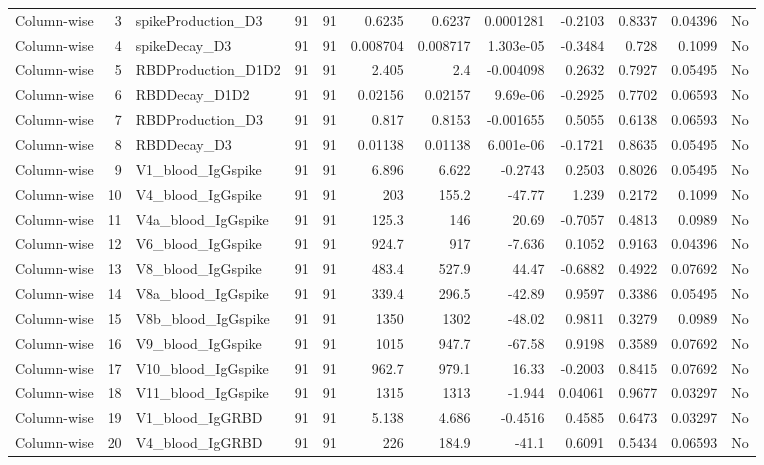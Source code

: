 \begin{longtable}{lrp{}rrrrrrrrl}
Column-wise & 3 & spikeProduction\_D3 & 91 & 91 & 0.6235 & 0.6237 & 0.0001281 & -0.2103 & 0.8337 & 0.04396 & No \\
Column-wise & 4 & spikeDecay\_D3 & 91 & 91 & 0.008704 & 0.008717 & 1.303e-05 & -0.3484 & 0.728 & 0.1099 & No \\
Column-wise & 5 & RBDProduction\_D1D2 & 91 & 91 & 2.405 & 2.4 & -0.004098 & 0.2632 & 0.7927 & 0.05495 & No \\
Column-wise & 6 & RBDDecay\_D1D2 & 91 & 91 & 0.02156 & 0.02157 & 9.69e-06 & -0.2925 & 0.7702 & 0.06593 & No \\
Column-wise & 7 & RBDProduction\_D3 & 91 & 91 & 0.817 & 0.8153 & -0.001655 & 0.5055 & 0.6138 & 0.06593 & No \\
Column-wise & 8 & RBDDecay\_D3 & 91 & 91 & 0.01138 & 0.01138 & 6.001e-06 & -0.1721 & 0.8635 & 0.05495 & No \\
Column-wise & 9 & V1\_blood\_IgGspike & 91 & 91 & 6.896 & 6.622 & -0.2743 & 0.2503 & 0.8026 & 0.05495 & No \\
Column-wise & 10 & V4\_blood\_IgGspike & 91 & 91 & 203 & 155.2 & -47.77 & 1.239 & 0.2172 & 0.1099 & No \\
Column-wise & 11 & V4a\_blood\_IgGspike & 91 & 91 & 125.3 & 146 & 20.69 & -0.7057 & 0.4813 & 0.0989 & No \\
Column-wise & 12 & V6\_blood\_IgGspike & 91 & 91 & 924.7 & 917 & -7.636 & 0.1052 & 0.9163 & 0.04396 & No \\
Column-wise & 13 & V8\_blood\_IgGspike & 91 & 91 & 483.4 & 527.9 & 44.47 & -0.6882 & 0.4922 & 0.07692 & No \\
Column-wise & 14 & V8a\_blood\_IgGspike & 91 & 91 & 339.4 & 296.5 & -42.89 & 0.9597 & 0.3386 & 0.05495 & No \\
Column-wise & 15 & V8b\_blood\_IgGspike & 91 & 91 & 1350 & 1302 & -48.02 & 0.9811 & 0.3279 & 0.0989 & No \\
Column-wise & 16 & V9\_blood\_IgGspike & 91 & 91 & 1015 & 947.7 & -67.58 & 0.9198 & 0.3589 & 0.07692 & No \\
Column-wise & 17 & V10\_blood\_IgGspike & 91 & 91 & 962.7 & 979.1 & 16.33 & -0.2003 & 0.8415 & 0.07692 & No \\
Column-wise & 18 & V11\_blood\_IgGspike & 91 & 91 & 1315 & 1313 & -1.944 & 0.04061 & 0.9677 & 0.03297 & No \\
Column-wise & 19 & V1\_blood\_IgGRBD & 91 & 91 & 5.138 & 4.686 & -0.4516 & 0.4585 & 0.6473 & 0.03297 & No \\
Column-wise & 20 & V4\_blood\_IgGRBD & 91 & 91 & 226 & 184.9 & -41.1 & 0.6091 & 0.5434 & 0.06593 & No \\

\end{longtable}
